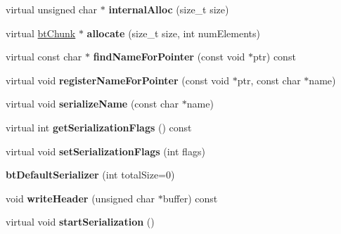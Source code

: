 \begin{DoxyCompactItemize}
virtual unsigned char $\ast$ {\bfseries internal\+Alloc} (size\+\_\+t size)
\item 
\mbox{\label{classbtDefaultSerializer_a46e3eb69e93e640fe253731ca701d9bf}} 
virtual \hyperlink{classbtChunk}{bt\+Chunk} $\ast$ {\bfseries allocate} (size\+\_\+t size, int num\+Elements)
\item 
\mbox{\label{classbtDefaultSerializer_a0a44d8a84246d2c7da819389195889df}} 
virtual const char $\ast$ {\bfseries find\+Name\+For\+Pointer} (const void $\ast$ptr) const
\item 
\mbox{\label{classbtDefaultSerializer_a7676d536d11cca634b65bd2899cf20f2}} 
virtual void {\bfseries register\+Name\+For\+Pointer} (const void $\ast$ptr, const char $\ast$name)
\item 
\mbox{\label{classbtDefaultSerializer_a481719115145d98cb9fac2abb36b53f5}} 
virtual void {\bfseries serialize\+Name} (const char $\ast$name)
\item 
\mbox{\label{classbtDefaultSerializer_a4fefe4895fed67fa5c6c65efb37c3f60}} 
virtual int {\bfseries get\+Serialization\+Flags} () const
\item 
\mbox{\label{classbtDefaultSerializer_a0efbc130ca12590028ab5e30c7e0c54d}} 
virtual void {\bfseries set\+Serialization\+Flags} (int flags)
\item 
\mbox{\label{classbtDefaultSerializer_a1c9914bdda6a6ca27be61adb8b44acb5}} 
{\bfseries bt\+Default\+Serializer} (int total\+Size=0)
\item 
\mbox{\label{classbtDefaultSerializer_ac5beeb200647073e6c48a2bce4bf7427}} 
void {\bfseries write\+Header} (unsigned char $\ast$buffer) const
\item 
\mbox{\label{classbtDefaultSerializer_a4baf73f945f39b82b7a63482e51704ca}} 
virtual void {\bfseries start\+Serialization} ()
\item 
\mbox{\label{classbtDefaultSerializer_aaf3755dc93e87cfd9b25103ce81ff452}} 

\end{DoxyCompactItemize}

